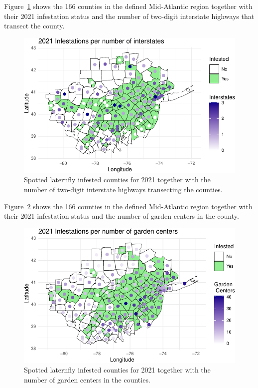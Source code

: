 \documentclass[
  letterpaper,
  DIV=11,
  numbers=noendperiod]{scrartcl}
\begin{document}
Figure~\ref{fig-figure-3} shows the 166 counties in the defined
Mid-Atlantic region together with their 2021 infestation status and the
number of two-digit interstate highways that transect the county.

\begin{figure}

{\centering \includegraphics{revisions_statistical_analysis_files/figure-pdf/fig-figure-3-1.pdf}

}

\caption{\label{fig-figure-3}Spotted laternfly infested counties for
2021 together with the number of two-digit interstate highways
transecting the counties.}

\end{figure}

Figure~\ref{fig-figure-4} shows the 166 counties in the defined
Mid-Atlantic region together with their 2021 infestation status and the
number of garden centers in the county.

\begin{figure}

{\centering \includegraphics{revisions_statistical_analysis_files/figure-pdf/fig-figure-4-1.pdf}

}

\caption{\label{fig-figure-4}Spotted laternfly infested counties for
2021 together with the number of garden centers in the counties.}

\end{figure}
\end{document}
